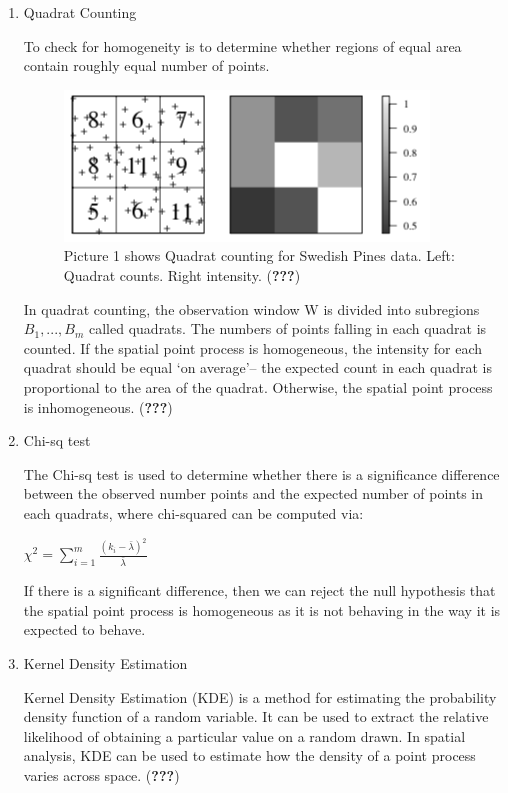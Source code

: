 \documentclass[]{article}
\theoremstyle{definition}
\theoremstyle{definition}
\theoremstyle{definition}
\theoremstyle{remark}
\begin{document}
\begin{enumerate}
\def\labelenumi{\arabic{enumi}.}
\item
  Quadrat Counting

  To check for homogeneity is to determine whether regions of equal area
  contain roughly equal number of points.

  \begin{figure}
  \centering
  \includegraphics{pictures/quadratcount.png}
  \caption{Picture 1 shows Quadrat counting for Swedish Pines data.
  Left: Quadrat counts. Right intensity. ({\textbf{???}})}
  \end{figure}

  In quadrat counting, the observation window W is divided into
  subregions \(B_{1},...,B_{m}\) called quadrats. The numbers of points
  falling in each quadrat is counted. If the spatial point process is
  homogeneous, the intensity for each quadrat should be equal `on
  average'-- the expected count in each quadrat is proportional to the
  area of the quadrat. Otherwise, the spatial point process is
  inhomogeneous. ({\textbf{???}})
\item
  Chi-sq test

  The Chi-sq test is used to determine whether there is a significance
  difference between the observed number points and the expected number
  of points in each quadrats, where chi-squared can be computed via:

  \(\chi^2=\sum_{i=1}^m\frac{(k_i-\bar{\lambda})^2}{\bar{\lambda}}\)

  If there is a significant difference, then we can reject the null
  hypothesis that the spatial point process is homogeneous as it is not
  behaving in the way it is expected to behave.
\item
  Kernel Density Estimation

  Kernel Density Estimation (KDE) is a method for estimating the
  probability density function of a random variable. It can be used to
  extract the relative likelihood of obtaining a particular value on a
  random drawn. In spatial analysis, KDE can be used to estimate how the
  density of a point process varies across space. ({\textbf{???}})


\end{enumerate}
\end{document}
